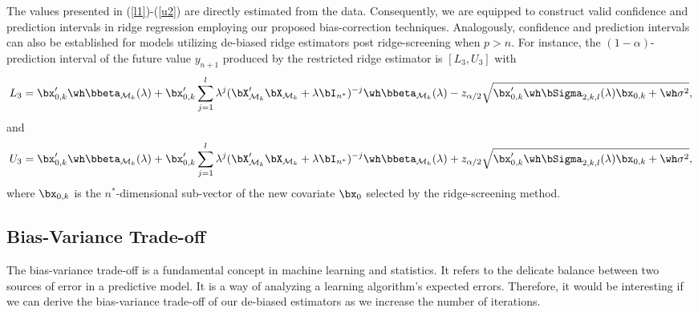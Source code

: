 The values presented in (\ref{l1})-(\ref{u2}) are directly estimated from the data. Consequently, we are equipped to construct valid confidence and prediction intervals in ridge regression employing our proposed bias-correction techniques. Analogously, confidence and prediction intervals can also be established for models utilizing de-biased ridge estimators post ridge-screening when $p>n$. For instance, the 
 $(1-\alpha)$-prediction interval of the future value $y_{n+1}$  produced by the restricted ridge estimator is $[L_3,U_3]$ with
\begin{equation}\label{l3}
   L_3=\bx_{0,k}'\wh\bbeta_{\mathcal{M}_k}(\lambda)+\bx_{0,k}'\sum_{j=1}^l\lambda^j(\bX_{\mathcal{M}_k}'\bX_{\mathcal{M}_k}+\lambda\bI_{n^*})^{-j}\wh\bbeta_{\mathcal{M}_k}(\lambda)-z_{\alpha/2}\sqrt{\bx_{0,k}'\wh\bSigma_{2,k,l}(\lambda)\bx_{0,k}+\wh\sigma^2},
\end{equation}
and
\begin{equation}\label{u3}
U_3=\bx_{0,k}'\wh\bbeta_{\mathcal{M}_k}(\lambda)+\bx_{0,k}'\sum_{j=1}^l\lambda^j(\bX_{\mathcal{M}_k}'\bX_{\mathcal{M}_k}+\lambda\bI_{n^*})^{-j}\wh\bbeta_{\mathcal{M}_k}(\lambda)+z_{\alpha/2}\sqrt{\bx_{0,k}'\wh\bSigma_{2,k,l}(\lambda)\bx_{0,k}+\wh\sigma^2},
\end{equation}
 where $\bx_{0,k}$ is the $n^*$-dimensional sub-vector of the new covariate $\bx_0$ selected by the ridge-screening method.

\subsection{Bias-Variance Trade-off}
The bias-variance trade-off is a fundamental concept in machine learning and statistics. It refers to the delicate balance between two sources of error in a predictive model. It is a way of analyzing a learning algorithm's expected errors. Therefore, it would be interesting if we can derive the bias-variance trade-off of our de-biased estimators as we increase the number of iterations.

